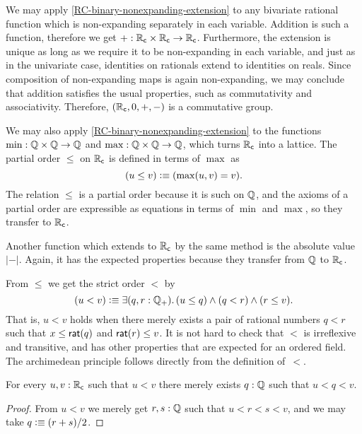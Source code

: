 We may apply \autoref{RC-binary-nonexpanding-extension} to any bivariate rational function
which is non-expanding separately in each variable. Addition is such a function, therefore
we get ${+} : \mathbb{R}_\mathsf{c} \times \mathbb{R}_\mathsf{c} \to \mathbb{R}_\mathsf{c}$.
%
Furthermore, the extension is unique as long as we
require it to be non-expanding in each variable, and just as in the univariate case,
identities on rationals extend to identities on reals. Since composition of non-expanding
maps is again non-expanding, we may conclude that addition satisfies the usual properties,
such as commutativity and associativity.
%
Therefore, $(\mathbb{R}_\mathsf{c}, 0, {+}, {-})$ is a commutative
group.

We may also apply \autoref{RC-binary-nonexpanding-extension} to the functions $\min : \mathbb{Q} \times
\mathbb{Q} \to \mathbb{Q}$ and $\max : \mathbb{Q} \times \mathbb{Q} \to \mathbb{Q}$, which turns $\mathbb{R}_\mathsf{c}$ into a lattice. The partial
order $\leq$ on $\mathbb{R}_\mathsf{c}$ is defined in terms of $\max$ as
%
\begin{equation*}
  (u \leq v) \vcentcolon\equiv (\max(u, v) = v).
\end{equation*}
%
The relation $\leq$ is a partial order because it is such on $\mathbb{Q}$, and the axioms of a
partial order are expressible as equations in terms of $\min$ and $\max$, so they transfer
to $\mathbb{R}_\mathsf{c}$.

Another function which extends to $\mathbb{R}_\mathsf{c}$ by the same method is the absolute value $|{-}|$.
Again, it has the expected properties because they transfer from $\mathbb{Q}$ to $\mathbb{R}_\mathsf{c}$.

From $\leq$ we get the strict order $<$ by
%
\begin{equation*}
  (u < v) \defeq \exis{q, r : \Qp} (u \leq q) \land (q < r) \land (r \leq v).
\end{equation*}
%
That is, $u < v$ holds when there merely exists a pair of rational numbers $q < r$ such that $x \leq
\mathsf{rat}(q)$ and $\mathsf{rat}(r) \leq v$. It is not hard to check that $<$ is irreflexive and
transitive, and has other properties that are expected for an ordered field.
The archimedean principle follows directly from the definition of~$<$.

%
\begin{thm} \label{RC-archimedean}
  For every $u, v : \mathbb{R}_\mathsf{c}$ such that $u < v$ there merely exists $q : \mathbb{Q}$ such that $u < q < v$.
\end{thm}

\begin{proof}
  From $u < v$ we merely get $r, s : \mathbb{Q}$ such that $u < r < s < v$, and we may take $q
  \vcentcolon\equiv (r + s) / 2$.
\end{proof}

